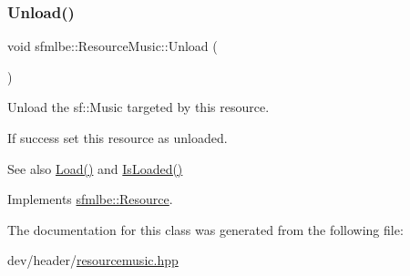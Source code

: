 \subsubsection{\texorpdfstring{Unload()}{Unload()}}
{\footnotesize\ttfamily void sfmlbe\+::\+Resource\+Music\+::\+Unload (\begin{DoxyParamCaption}{ }\end{DoxyParamCaption})\hspace{0.3cm}{\ttfamily [virtual]}}



Unload the sf\+::\+Music targeted by this resource. 

If success set this resource as unloaded. \begin{DoxySeeAlso}{See also}
\mbox{\hyperlink{classsfmlbe_1_1_resource_music_a8d612eff1f1f8847c2b96a616456e558}{Load()}} and \mbox{\hyperlink{classsfmlbe_1_1_resource_acd0812c81f7d5d851a4671f0cf7bb4f1}{Is\+Loaded()}} 
\end{DoxySeeAlso}


Implements \mbox{\hyperlink{classsfmlbe_1_1_resource_a48c75a88679cf457965dd013f47014b9}{sfmlbe\+::\+Resource}}.



The documentation for this class was generated from the following file\+:\begin{DoxyCompactItemize}
\item 
dev/header/\mbox{\hyperlink{resourcemusic_8hpp}{resourcemusic.\+hpp}}\end{DoxyCompactItemize}
